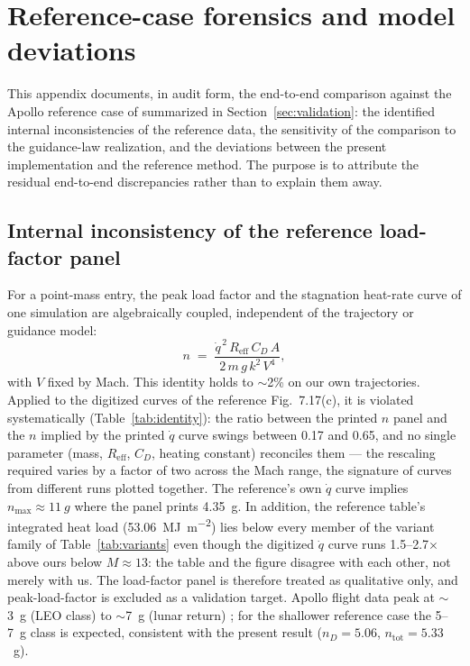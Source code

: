 \appendix
\section{Reference-case forensics and model deviations}
\label{app:validation}

This appendix documents, in audit form, the end-to-end comparison against
the Apollo reference case of \cite{dirkx2017entry} summarized in
Section~\ref{sec:validation}: the identified internal inconsistencies of
the reference data, the sensitivity of the comparison to the guidance-law
realization, and the deviations between the present implementation and the
reference method. The purpose is to attribute the residual end-to-end
discrepancies rather than to explain them away.

\subsection{Internal inconsistency of the reference load-factor panel}
\label{app:identity}

For a point-mass entry, the peak load factor and the stagnation heat-rate
curve of one simulation are algebraically coupled, independent of the
trajectory or guidance model:
\begin{equation}
n \;=\; \frac{\dot{q}^{\,2}\,R_{\mathrm{eff}}\,C_D\,A}
            {2\,m\,g\,k^2\,V^4},
\label{eq:identity}
\end{equation}
with $V$ fixed by Mach. This identity holds to $\sim$2\% on our own
trajectories. Applied to the digitized curves of the reference Fig.~7.17(c),
it is violated systematically (Table~\ref{tab:identity}): the ratio between
the printed $n$ panel and the $n$ implied by the printed $\dot{q}$ curve
swings between 0.17 and 0.65, and no single parameter (mass,
$R_{\mathrm{eff}}$, $C_D$, heating constant) reconciles them --- the
rescaling required varies by a factor of two across the Mach range, the
signature of curves from different runs plotted together. The reference's
own $\dot{q}$ curve implies $n_{\max}\approx\SI{11}{g}$ where the panel
prints \SI{4.35}{g}. In addition, the reference table's integrated heat
load (\SI{53.06}{\mega\joule\per\square\metre}) lies below every member of
the variant family of Table~\ref{tab:variants} even though the digitized
$\dot{q}$ curve runs 1.5--2.7$\times$ above ours below $M\approx13$: the
table and the figure disagree with each other, not merely with us. The
load-factor panel is therefore treated as qualitative only, and
peak-load-factor is excluded as a validation target. Apollo flight data
peak at $\sim$3~g (LEO class) to $\sim$7~g (lunar return)
\cite{hillje1969apollo,moseley1969wind}; for the shallower reference case
the 5--7~g class is expected, consistent with the present result
($n_D=5.06$, $n_{\mathrm{tot}}=5.33$~g).

